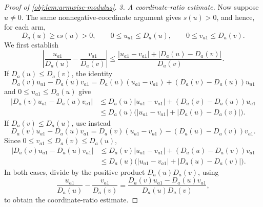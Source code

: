 \documentclass[11pt]{article}
\begin{document}
\begin{proof}[Proof of \cref{obj:lem:armwise-modulus}]
\emph{3. A coordinate-ratio estimate.}
Now suppose \(u\neq0\). The same nonnegative-coordinate argument gives \(s(u)>0\), and hence, for each arm,
\[
D_a(u)\geq\epsilon s(u)>0,\qquad
0\leq u_{a1}\leq D_a(u),\qquad
0\leq v_{a1}\leq D_a(v).
\]
We first establish
\[
\left|\frac{u_{a1}}{D_a(u)}-\frac{v_{a1}}{D_a(v)}\right|
\leq
\frac{|u_{a1}-v_{a1}|+|D_a(u)-D_a(v)|}{D_a(v)}.
\]
If \(D_a(u)\leq D_a(v)\), the identity
\[
D_a(v)u_{a1}-D_a(u)v_{a1}
=
D_a(u)(u_{a1}-v_{a1})
+(D_a(v)-D_a(u))u_{a1}
\]
and \(0\leq u_{a1}\leq D_a(u)\) give
\[
\begin{aligned}
|D_a(v)u_{a1}-D_a(u)v_{a1}|
&\leq D_a(u)|u_{a1}-v_{a1}|
 +(D_a(v)-D_a(u))u_{a1}\\
&\leq D_a(u)
 \bigl(|u_{a1}-v_{a1}|+|D_a(u)-D_a(v)|\bigr).
\end{aligned}
\]
If \(D_a(v)\leq D_a(u)\), use instead
\[
D_a(v)u_{a1}-D_a(u)v_{a1}
=
D_a(v)(u_{a1}-v_{a1})
-(D_a(u)-D_a(v))v_{a1}.
\]
Since \(0\leq v_{a1}\leq D_a(v)\leq D_a(u)\),
\[
\begin{aligned}
|D_a(v)u_{a1}-D_a(u)v_{a1}|
&\leq D_a(v)|u_{a1}-v_{a1}|
 +(D_a(u)-D_a(v))v_{a1}\\
&\leq D_a(u)
 \bigl(|u_{a1}-v_{a1}|+|D_a(u)-D_a(v)|\bigr).
\end{aligned}
\]
In both cases, divide by the positive product \(D_a(u)D_a(v)\), using
\[
\frac{u_{a1}}{D_a(u)}-\frac{v_{a1}}{D_a(v)}
=
\frac{D_a(v)u_{a1}-D_a(u)v_{a1}}{D_a(u)D_a(v)},
\]
to obtain the coordinate-ratio estimate.


\end{proof}
\end{document}
